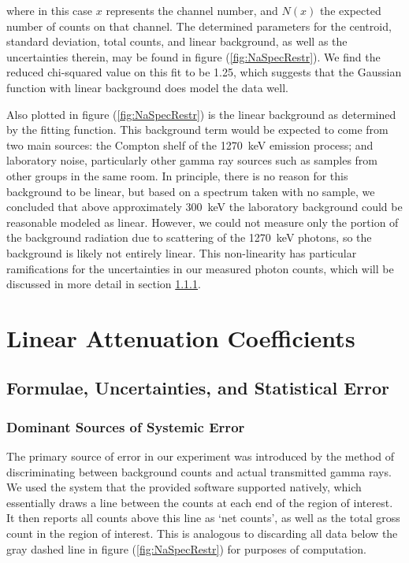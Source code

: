 \documentclass[letter]{article}
\begin{document}
where in this case $x$ represents the channel number, and $N(x)$ the expected number of counts on that channel. The determined parameters for the centroid, standard deviation, total counts, and linear background, as well as the uncertainties therein, may be found in figure (\ref{fig:NaSpecRestr}). We find the reduced chi-squared value on this fit to be 1.25, which suggests that the Gaussian function with linear background does model the data well.

Also plotted in figure (\ref{fig:NaSpecRestr}) is the linear background as determined by the fitting function. This background term would be expected to come from two main sources: the Compton shelf of the \qty{1270}{\kilo\electronvolt} emission process; and laboratory noise, particularly other gamma ray sources such as samples from other groups in the same room. In principle, there is no reason for this background to be linear, but based on a spectrum taken with no sample, we concluded that above approximately \qty{300}{\kilo\electronvolt} the laboratory background could be reasonable modeled as linear. However, we could not measure only the portion of the background radiation due to scattering of the \qty{1270}{\kilo\electronvolt} photons, so the background is likely not entirely linear. This non-linearity has particular ramifications for the uncertainties in our measured photon counts, which will be discussed in more detail in section \ref{sss:SysError}.


\section{Linear Attenuation Coefficients}

\subsection{Formulae, Uncertainties, and Statistical Error}

\subsubsection{Dominant Sources of Systemic Error} \label{sss:SysError}

The primary source of error in our experiment was introduced by the method of discriminating between background counts and actual transmitted gamma rays. We used the system that the provided software supported natively, which essentially draws a line between the counts at each end of the region of interest. It then reports all counts above this line as `net counts', as well as the total gross count in the region of interest. This is analogous to discarding all data below the gray dashed line in figure (\ref{fig:NaSpecRestr}) for purposes of computation.
\end{document}
